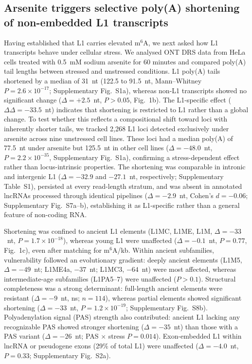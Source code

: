 \documentclass[11pt]{article}
\newcommand{\msix}{m$^6$A}
\begin{document}
\subsection{Arsenite triggers selective poly(A) shortening of non-embedded L1 transcripts}

Having established that L1 carries elevated \msix{}, we next asked how
L1 transcripts behave under cellular stress. We analysed ONT DRS data
from HeLa cells treated with 0.5~mM sodium arsenite for 60 minutes
\citep{deMuro2024} and compared poly(A) tail lengths between stressed
and unstressed conditions. L1 poly(A) tails shortened by a median of
31~nt (122.5 to 91.5~nt, Mann--Whitney $P = 2.6 \times 10^{-17}$;
Supplementary Fig.~S1a),
whereas non-L1 transcripts showed no significant change
($\Delta = +2.5$~nt, $P > 0.05$, Fig.~1b). The L1-specific effect
($\Delta\Delta = -33.5$~nt) indicates that shortening is restricted to
L1 rather than a global change. To test whether this reflects a
compositional shift toward loci with inherently shorter tails, we
tracked 2,268 L1 loci detected exclusively under arsenite across nine
unstressed cell lines. These loci had a median poly(A) of 77.5~nt under
arsenite but 125.5~nt in other cell lines ($\Delta = -48.0$~nt,
$P = 2.2 \times 10^{-35}$, Supplementary Fig.~S1a), confirming a stress-dependent
effect rather than locus-intrinsic properties. The shortening was
comparable in intronic and intergenic L1 ($\Delta = -32.9$ and
$-27.1$~nt, respectively; Supplementary Table~S1), persisted at every
read-length stratum, and was absent in annotated lncRNAs processed
through identical pipelines ($\Delta = -2.9$~nt, Cohen's $d = -0.06$;
Supplementary Fig.~S7a--b), establishing it as L1-specific rather than
a general feature of non-coding RNA.

Shortening was confined to ancient L1 elements (L1MC, L1ME, L1M,
$\Delta = -33$~nt, $P = 1.7 \times 10^{-18}$), whereas young L1 were
unaffected ($\Delta = -0.1$~nt, $P = 0.77$, Fig.~1c), even after
matching for \msix{}/kb. Within ancient subfamilies, vulnerability
followed an evolutionary gradient: deeply ancient elements (L1M5,
$\Delta = -49$~nt; L1ME4a, $-37$~nt; L1MC3, $-64$~nt) were most
affected, whereas intermediate-age subfamilies (L1PA5--7) were
unaffected ($P > 0.1$). Structural completeness
was a strong determinant: full-length ancient elements were resistant
($\Delta = -9$~nt, ns; $n = 114$), whereas partial elements showed
significant shortening ($\Delta = -33$~nt,
$P = 1.2 \times 10^{-19}$; Supplementary Fig.~S8b).
Polyadenylation signal (PAS) strength also contributed: ancient L1
lacking any recognizable PAS showed stronger shortening
($\Delta = -35$~nt) than those with a PAS variant ($\Delta = -26$~nt;
PAS $\times$ stress $P = 0.014$).
Exon-embedded L1 within lncRNA or
pseudogene exons (29\% of total L1) were unaffected ($\Delta = -4.0$~nt,
$P = 0.33$; Supplementary Fig.~S2a).
\end{document}
